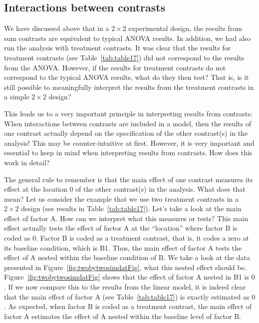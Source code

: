 \documentclass[12pt,]{krantz}
\theoremstyle{definition}
\theoremstyle{definition}
\theoremstyle{definition}
\theoremstyle{remark}
\begin{document}
\hypertarget{interactions-between-contrasts}{%
\subsection{Interactions between contrasts}\label{interactions-between-contrasts}}

We have discussed above that in a \(2 \times 2\) experimental design, the results from sum contrasts are equivalent to typical ANOVA results. In addition, we had also run the analysis with treatment contrasts. It was clear that the results for treatment contrasts (see Table~\ref{tab:table17}) did not correspond to the results from the ANOVA. However, if the results for treatment contrasts do not correspond to the typical ANOVA results, what do they then test? That is, is it still possible to meaningfully interpret the results from the treatment contrasts in a simple \(2 \times 2\) design?

This leads us to a very important principle in interpreting results from contrasts: When interactions between contrasts are included in a model, then the results of one contrast actually depend on the specification of the other contrast(s) in the analysis! This may be counter-intuitive at first. However, it is very important and essential to keep in mind when interpreting results from contrasts. How does this work in detail?

The general rule to remember is that the main effect of one contrast measures its effect at the location \(0\) of the other contrast(s) in the analysis. What does that mean? Let us consider the example that we use two treatment contrasts in a \(2 \times 2\) design (see results in Table~\ref{tab:table17}). Let's take a look at the main effect of factor A. How can we interpret what this measures or tests? This main effect actually tests the effect of factor A at the ``location'' where factor B is coded as \(0\). Factor B is coded as a treatment contrast, that is, it codes a zero at its baseline condition, which is B1. Thus, the main effect of factor A tests the effect of A nested within the baseline condition of B. We take a look at the data presented in Figure~\ref{fig:twobytwosimdatFig}, what this nested effect should be. Figure~\ref{fig:twobytwosimdatFig} shows that the effect of factor A nested in B1 is \(0\). If we now compare this to the results from the linear model, it is indeed clear that the main effect of factor A (see Table~\ref{tab:table17}) is exactly estimated as \(0\). As expected, when factor B is coded as a treatment contrast, the main effect of factor A estimates the effect of A nested within the baseline level of factor B.
\end{document}
